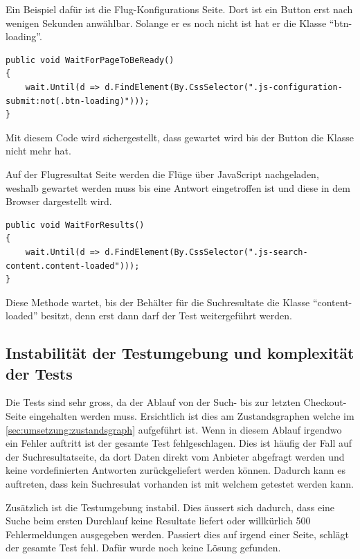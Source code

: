 Ein Beispiel dafür ist die Flug-Konfigurations Seite. Dort ist ein Button erst nach wenigen Sekunden anwählbar.
Solange er es noch nicht ist hat er die Klasse "`btn-loading"'. 

\lstset{language=csh}
\begin{lstlisting}
public void WaitForPageToBeReady()
{
    wait.Until(d => d.FindElement(By.CssSelector(".js-configuration-submit:not(.btn-loading)")));
}
\end{lstlisting}

Mit diesem Code wird sichergestellt, dass gewartet wird bis der Button die Klasse nicht mehr hat.

Auf der Flugresultat Seite werden die Flüge über JavaScript nachgeladen, weshalb gewartet werden muss bis eine Antwort eingetroffen ist und diese in dem Browser dargestellt wird.

\begin{lstlisting}
public void WaitForResults()
{
    wait.Until(d => d.FindElement(By.CssSelector(".js-search-content.content-loaded")));
}
\end{lstlisting}

Diese Methode wartet, bis der Behälter für die Suchresultate die Klasse "`content-loaded"' besitzt, denn erst dann darf der Test weitergeführt werden.

\subsection{Instabilität der Testumgebung und komplexität der Tests}
Die Tests sind sehr gross, da der Ablauf von der Such- bis zur letzten Checkout-Seite eingehalten werden muss. Ersichtlich ist dies am Zustandsgraphen welche im \cref{sec:umsetzung:zustandsgraph}  aufgeführt ist. Wenn in diesem Ablauf irgendwo ein Fehler auftritt ist der gesamte Test fehlgeschlagen. Dies ist häufig der Fall auf der Suchresultatseite, da dort Daten direkt vom Anbieter abgefragt werden und keine vordefinierten Antworten zurückgeliefert werden können. Dadurch kann es auftreten, dass kein Suchresulat vorhanden ist mit welchem getestet werden kann.

Zusätzlich ist die Testumgebung instabil. Dies äussert sich dadurch, dass eine Suche beim ersten Durchlauf keine Resultate liefert oder willkürlich 500 Fehlermeldungen ausgegeben werden. Passiert dies auf irgend einer Seite, schlägt der gesamte Test fehl. Dafür wurde noch keine Lösung gefunden.